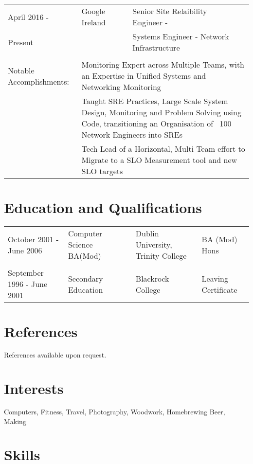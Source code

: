 \documentclass[a4paper, 11pt] {article}
\begin{document}
\begin{tabular}{llll}
April 2016 -	&	Google Ireland		&  Senior Site Relaibility Engineer -		  &	\hspace{10mm}	\\
Present		&				&  Systems Engineer - Network Infrastructure      &            		\\
      		&				&              					  &            		\\
Notable Accomplishments: & \multicolumn{3}{l}{Monitoring Expert across Multiple Teams, with an Expertise in Unified Systems and Networking Monitoring} \\
			 & \multicolumn{3}{l}{Taught SRE Practices, Large Scale System Design, Monitoring and Problem Solving using Code, transitioning an Organisation of ~100 Network Engineers into SREs} \\
			 & \multicolumn{3}{l}{Tech Lead of a Horizontal, Multi Team effort to Migrate to a SLO Measurement tool and new SLO targets} \\
			 
\end{tabular}

\section*{Education and Qualifications}

\begin{tabular}{l l l l l}
October 2001 - June 2006 	& Computer Science BA(Mod) &	& Dublin University, Trinity College & BA (Mod) Hons \\
			 	&			   &	&				     &		     \\
September 1996 - June 2001	& Secondary Education	   &	& Blackrock College	& Leaving Certificate	     \\
\end{tabular}

\section*{References}

References available upon request.

\pagebreak

\section*{Interests}

Computers, Fitness, Travel, Photography, Woodwork, Homebrewing Beer, Making

\section*{Skills}
\end{document}

